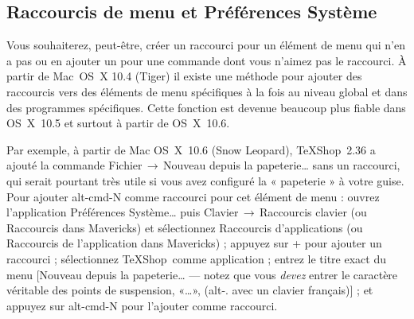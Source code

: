 \documentclass[11pt,french]{article}
\newcommand{\TS}{\textsf{\TeX Shop}}
\newcommand{\cmd}[1]{\textsf{#1}}
\newcommand{\mnu}[1]{\textsf{#1}}
\newcommand{\To}{\,\(\to\)\,}
\begin{document}

\subsection{Raccourcis de menu et Préférences Système} 

Vous souhaiterez, peut-être, créer un raccourci pour un élément de menu qui n'en a pas ou en ajouter un pour une commande dont vous n'aimez pas le raccourci. À partir de Mac~OS~X 10.4 (Tiger) il existe une méthode pour ajouter des raccourcis vers des éléments de menu spécifiques à la fois au niveau global et dans des programmes spécifiques. Cette fonction est devenue beaucoup plus fiable dans OS~X~10.5 et surtout à partir de OS~X~10.6.


Par exemple, à partir de Mac OS~X~10.6 (Snow Leopard), \TS\ 2.36 a ajouté la commande \mnu{Fichier}\To\mnu{Nouveau depuis la papeterie…} sans un raccourci, qui serait pourtant très utile si vous avez configuré la « papeterie » à votre guise. Pour ajouter \cmd{alt-cmd-N} comme raccourci pour cet élément de menu : ouvrez l'application \textsf{Préférences Système…} puis \mnu{Clavier}\To\mnu{Raccourcis clavier} (ou \mnu{Raccourcis} dans \cmd{Mavericks}) et sélectionnez \mnu{Raccourcis d'applications} (ou \mnu{Raccourcis de l'application} dans \cmd{Mavericks}) ; appuyez sur \mnu{+} pour ajouter un raccourci ; sélectionnez \TS\ comme application ; entrez le titre exact du menu [\mnu{Nouveau depuis la papeterie…} --- notez que vous \emph{devez} entrer le caractère véritable des points de suspension, «…», (\cmd{alt-.} avec un clavier français)] ; et appuyez sur \cmd{alt-cmd-N} pour l'ajouter comme raccourci.
\end{document}

